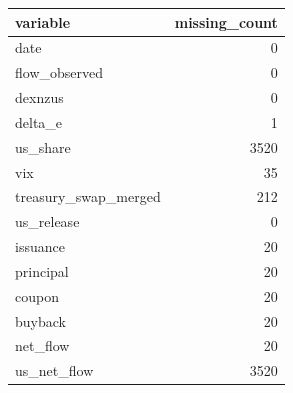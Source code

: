 \begin{tabular}{lr}
\toprule
variable & missing\_count \\
\midrule
date & 0 \\
flow\_observed & 0 \\
dexnzus & 0 \\
delta\_e & 1 \\
us\_share & 3520 \\
vix & 35 \\
treasury\_swap\_merged & 212 \\
us\_release & 0 \\
issuance & 20 \\
principal & 20 \\
coupon & 20 \\
buyback & 20 \\
net\_flow & 20 \\
us\_net\_flow & 3520 \\
\bottomrule
\end{tabular}
